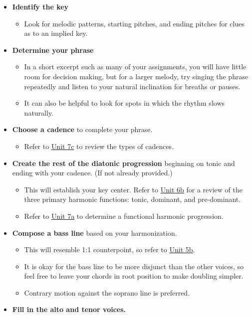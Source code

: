 \documentclass{book}
\providecommand{\tightlist}{%
  \setlength{\itemsep}{0pt}\setlength{\parskip}{0pt}}
\begin{document}
\begin{itemize}
\tightlist
\item
  \textbf{Identify the key}

  \begin{itemize}
  \tightlist
  \item
    Look for melodic patterns, starting pitches, and ending pitches for clues
    as to an implied key.
  \end{itemize}
\item
  \textbf{Determine your phrase}

  \begin{itemize}
  \tightlist
  \item
    In a short excerpt such as many of your assignments, you will have little
    room for decision making, but for a larger melody, try singing the phrase
    repeatedly and listen to your natural inclination for breaths or pauses.
  \item
    It can also be helpful to look for spots in which the rhythm slows
    naturally.
  \end{itemize}
\item
  \textbf{Choose a cadence} to complete your phrase.

  \begin{itemize}
  \tightlist
  \item
    Refer to \href{07-harmonic-functions/c1-cadences.html}{Unit 7c} to review
    the types of cadences.
  \end{itemize}
\item
  \textbf{Create the rest of the diatonic progression} beginning on tonic and
  ending with your cadence. (If not already provided.)

  \begin{itemize}
  \tightlist
  \item
    This will establish your key center. Refer to
    \href{06-intro-harmonic/b1-diafuncvoicelead.html}{Unit 6b} for a review of
    the three primary harmonic functions: tonic, dominant, and pre-dominant.
  \item
    Refer to \href{07-harmonic-functions/a1-diaprogcirclefifths.html}{Unit 7a}
    to determine a functional harmonic progression.
  \end{itemize}
\item
  \textbf{Compose a bass line} based on your harmonization.

  \begin{itemize}
  \tightlist
  \item
    This will resemble 1:1 counterpoint, so refer to
    \href{05-counterpoint-embell-shapes/b1-cantfirmand1st.html}{Unit 5b}.
  \item
    It is okay for the bass line to be more disjunct than the other voices, so
    feel free to leave your chords in root position to make doubling simpler.
  \item
    Contrary motion against the soprano line is preferred.
  \end{itemize}
\item
  \textbf{Fill in the alto and tenor voices.}


\end{itemize}
\end{document}
